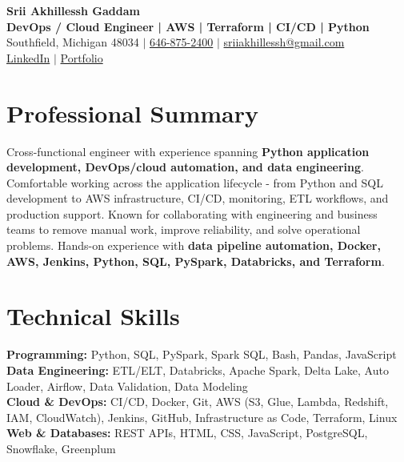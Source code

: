 \documentclass[letterpaper,10pt]{article}
\begin{document}
\fontsize{9.35pt}{10.45pt}\selectfont

\begin{center}
    {\LARGE \textbf{Srii Akhillessh Gaddam}} \\[-1pt]
    \textbf{DevOps / Cloud Engineer | AWS | Terraform | CI/CD | Python} \\[2pt]
    Southfield, Michigan 48034 $|$
    \href{tel:6468752400}{646-875-2400} $|$
    \href{mailto:sriiakhillessh@gmail.com}{sriiakhillessh@gmail.com} \\[1pt]
    \href{https://www.linkedin.com/in/srii-akhiilessh-gaddam-b48668191/}{LinkedIn} $|$
    \href{https://sriiakhillesshg.github.io/portfolio/}{Portfolio}
\end{center}
\vspace{-8pt}

\section{Professional Summary}
\small{Cross-functional engineer with experience spanning \textbf{Python application development, DevOps/cloud automation, and data engineering}. Comfortable working across the application lifecycle - from Python and SQL development to AWS infrastructure, CI/CD, monitoring, ETL workflows, and production support. Known for collaborating with engineering and business teams to remove manual work, improve reliability, and solve operational problems. Hands-on experience with \textbf{data pipeline automation, Docker, AWS, Jenkins, Python, SQL, PySpark, Databricks, and Terraform}.}

\section{Technical Skills}
\small{
\textbf{Programming:} Python, SQL, PySpark, Spark SQL, Bash, Pandas, JavaScript \\
\textbf{Data Engineering:} ETL/ELT, Databricks, Apache Spark, Delta Lake, Auto Loader, Airflow, Data Validation, Data Modeling \\
\textbf{Cloud \& DevOps:} CI/CD, Docker, Git, AWS (S3, Glue, Lambda, Redshift, IAM, CloudWatch), Jenkins, GitHub, Infrastructure as Code, Terraform, Linux \\
\textbf{Web \& Databases:} REST APIs, HTML, CSS, JavaScript, PostgreSQL, Snowflake, Greenplum
}
\end{document}
